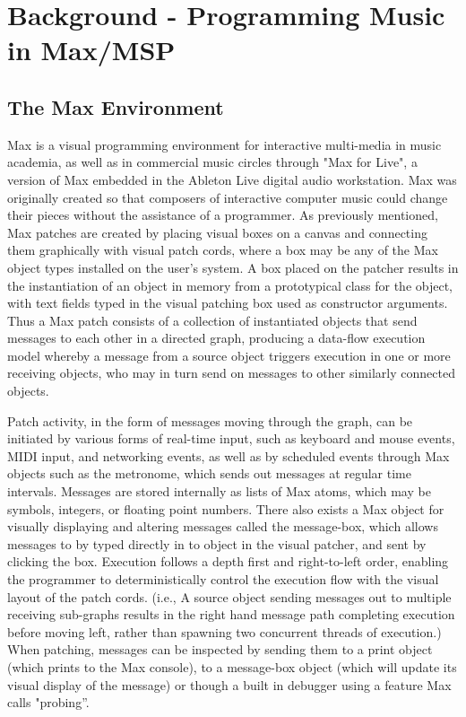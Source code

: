 \documentclass[acmsmall]{acmart}
\begin{document}
\section{Background - Programming Music in Max/MSP}

\subsection{The Max Environment}

Max is a visual programming environment for interactive multi-media in music academia,
as well as in commercial music circles through "Max for Live", a version of Max embedded 
in the Ableton Live digital audio workstation. Max was originally
created so that composers of interactive computer music could change their pieces without the 
assistance of a programmer.
As previously mentioned, Max patches are created by placing visual boxes on a canvas 
and connecting them graphically with visual patch cords, where a box may be
any of the Max object types installed on the user's system. A box placed on the patcher
results in the instantiation of an object in memory from a prototypical class for the object, with
text fields typed in the visual patching box used as constructor arguments. 
Thus a Max patch consists of a collection of instantiated objects that send messages to each other
in a directed graph, producing a data-flow execution model whereby a message from a source 
object triggers execution in one or more 
receiving objects, who may in turn send on messages to other similarly connected objects. 

Patch activity, in the form of messages moving through the graph, can be initiated by 
various forms of real-time input, such as keyboard and mouse events, MIDI input, and networking 
events, as well as by scheduled events through Max objects such as the metronome, which sends
out messages at regular time intervals. Messages are 
stored internally as lists of Max atoms, which may be symbols, integers, or floating point numbers. 
There also exists a Max object for visually displaying and altering messages called the message-box,
which allows messages to by typed directly in to object in the visual patcher, and sent by clicking the box.  
Execution follows a depth first and right-to-left order, enabling the programmer to deterministically 
control the execution flow with the visual layout of the patch cords. (i.e., A source object sending 
messages out to multiple receiving sub-graphs results in the right hand message path completing 
execution before moving left, rather than spawning two concurrent threads of execution.) When 
patching, messages can be inspected by sending them to a print object (which prints to the Max console),
to a message-box object (which will update its visual display of the message) 
or though a built in debugger using a feature Max calls "probing”.
\end{document}
